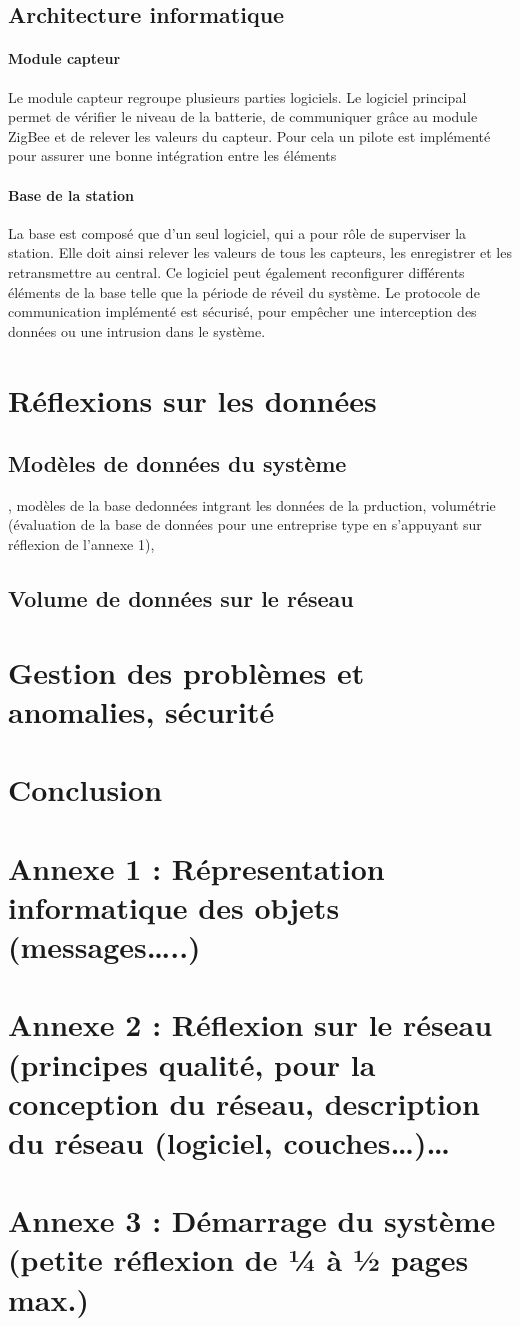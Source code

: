 \subsection{Architecture informatique}
\paragraph{Module capteur} Le module capteur regroupe plusieurs parties logiciels. Le logiciel principal permet de vérifier le niveau de la batterie, de communiquer grâce au module ZigBee et de relever les valeurs du capteur. Pour cela un pilote est implémenté pour assurer une bonne intégration entre les éléments
\paragraph{Base de la station} La base est composé que d’un seul logiciel, qui a pour rôle de superviser la station. Elle doit ainsi relever les valeurs de tous les capteurs, les enregistrer et les retransmettre au central. Ce logiciel peut également reconfigurer différents éléments de la base telle que la période de réveil du système. Le protocole de communication implémenté est sécurisé, pour empêcher une interception des données ou une intrusion dans le système.


\section{Réflexions sur les données}

\subsection{Modèles de données du système}
, modèles de la base dedonnées intgrant les données de la prduction, volumétrie (évaluation de la base de données
pour une entreprise type en s’appuyant sur réflexion de l’annexe 1),
\subsection{Volume de données sur le réseau}

\section{Gestion des problèmes et anomalies, sécurité}

\section{Conclusion}

\section{Annexe 1 : Répresentation informatique des objets (messages…..)}

\section{Annexe 2 : Réflexion sur le réseau (principes qualité, pour la conception du réseau,
description du réseau (logiciel, couches…)…}

\section{Annexe 3 : Démarrage du système (petite réflexion de ¼ à ½ pages max.)}
